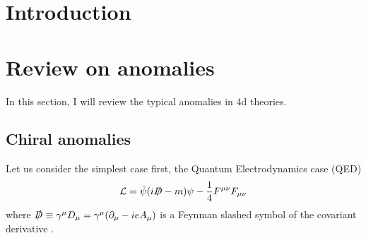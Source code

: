 \documentclass[a4paper,pdftex,10pt]{article}
\begin{document}
\maketitle

\tableofcontents

\clearpage
\section{Introduction}





\clearpage
\section{Review on anomalies}


In this section, I will review the typical anomalies in 4d theories.


\subsection{Chiral anomalies}

Let us consider the simplest case first, the Quantum Electrodynamics case (QED)
\begin{equation}
  \mathcal{L}
  =
  \bar{\psi}(i\slashed{D}-m)\psi
  -
  \frac{1}{4}F^{\mu\nu}F_{\mu\nu}
\end{equation}
where $\slashed{D}\equiv\gamma^{\mu}D_{\mu}=\gamma^{\mu}(\partial_{\mu}-ieA_{\mu})$ is a Feynman slashed symbol of the covariant derivative .

























\clearpage



\nocite{Arkani-Hamed:2001uol}

\end{document}
